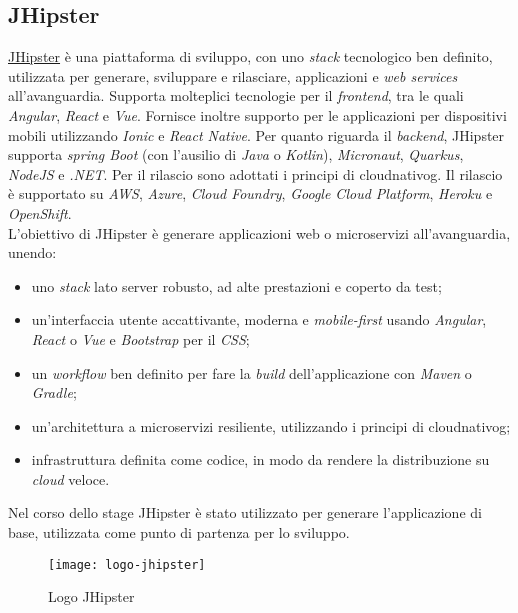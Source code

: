 \subsection{JHipster}
\label{jhi}
\href{https://www.jhipster.tech/}{JHipster} è una piattaforma di sviluppo, con uno \textit{stack} tecnologico ben definito, utilizzata per generare, sviluppare e rilasciare, applicazioni e \textit{web services} all'avanguardia. Supporta molteplici tecnologie per il \textit{frontend}, tra le quali \textit{Angular}, \textit{React} e \textit{Vue}. Fornisce inoltre supporto per le applicazioni per dispositivi mobili utilizzando \textit{Ionic} e \textit{React Native}. Per quanto riguarda il \textit{backend}, JHipster supporta \textit{spring Boot} (con l'ausilio di \textit{Java} o \textit{Kotlin}), \textit{Micronaut}, \textit{Quarkus}, \textit{NodeJS} e \textit{.NET}. Per il rilascio sono adottati i principi di \gls{cloudnativog}\glsfirstoccur{}. Il rilascio è supportato su \textit{AWS}, \textit{Azure}, \textit{Cloud Foundry}, \textit{Google Cloud Platform}, \textit{Heroku} e \textit{OpenShift}.
\\L'obiettivo di JHipster è generare applicazioni web o microservizi all'avanguardia, unendo:
\begin{itemize}
    \item uno \textit{stack} lato server robusto, ad alte prestazioni e coperto da test;
    \item un'interfaccia utente accattivante, moderna e \textit{mobile-first} usando \textit{Angular}, \textit{React} o \textit{Vue} e \textit{Bootstrap} per il \textit{CSS};
    \item un \textit{workflow} ben definito per fare la \textit{build} dell'applicazione con \textit{Maven} o \textit{Gradle};
    \item un'architettura a microservizi resiliente,  utilizzando i principi di \gls{cloudnativog};
    \item infrastruttura definita come codice, in modo da rendere la distribuzione su \textit{cloud} veloce.
\end{itemize}
\newpage
Nel corso dello stage JHipster è stato utilizzato per generare l'applicazione di base, utilizzata come punto di partenza per lo sviluppo.
\begin{figure}[h]
    \begin{center}
    \texttt{[image: logo-jhipster]}
    \caption{Logo JHipster}
    \label{fig:figure2}
    \end{center}
\end{figure}

